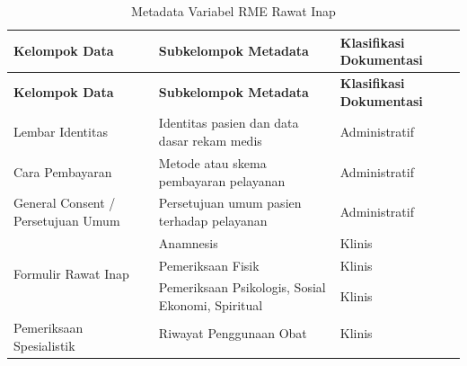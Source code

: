 \documentclass[bahasa, 12pt, a4paper, onecolumn, oneside, final]{report}
\begin{document}
\begin{longtable}{|p{4cm}|p{5.2cm}|p{3.2cm}|}
	\caption{Metadata Variabel RME Rawat Inap}
	\label{tab:metadata-rme-rawat-inap}                                                                   \\
	\hline
	\textbf{Kelompok Data}        &
	\textbf{Subkelompok Metadata} &
	\textbf{Klasifikasi Dokumentasi}                                                                      \\ \hline
	\endfirsthead

	\hline
	\textbf{Kelompok Data}        &
	\textbf{Subkelompok Metadata} &
	\textbf{Klasifikasi Dokumentasi}                                                                      \\ \hline
	\endhead

	Lembar Identitas
	                              & Identitas pasien dan data dasar rekam medis
	                              & Administratif                                                         \\ \hline

	Cara Pembayaran
	                              & Metode atau skema pembayaran pelayanan
	                              & Administratif                                                         \\ \hline

	General Consent / Persetujuan Umum
	                              & Persetujuan umum pasien terhadap pelayanan
	                              & Administratif                                                         \\ \hline

	\multirow{3}{4cm}{Formulir Rawat Inap}
	                              & Anamnesis
	                              & Klinis                                                                \\ \cline{2-3}

	                              & Pemeriksaan Fisik
	                              & Klinis                                                                \\ \cline{2-3}

	                              & Pemeriksaan Psikologis, Sosial Ekonomi, Spiritual
	                              & Klinis                                                                \\ \hline

	\multirow{10}{4cm}{Pemeriksaan Spesialistik}
	                              & Riwayat Penggunaan Obat
	                              & Klinis                                                                \\ \cline{2-3}


\end{longtable}
\end{document}
